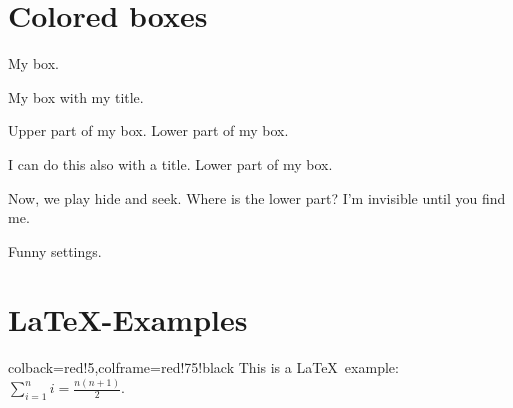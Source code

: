 \documentclass{article}
\begin{document}
\section{Colored boxes}

\begin{tcolorbox}[colback=red!5,colframe=red!75!black]
  My box.
\end{tcolorbox}

\begin{tcolorbox}[colback=blue!5,colframe=blue!75!black,title=My title]
  My box with my title.
\end{tcolorbox}

\begin{tcolorbox}[colback=green!5,colframe=green!75!black]
  Upper part of my box.
  \tcblower
  Lower part of my box.
\end{tcolorbox}

\begin{tcolorbox}[colback=yellow!5,colframe=yellow!75!black,title=My title]
  I can do this also with a title.
  \tcblower
  Lower part of my box.
\end{tcolorbox}

\begin{tcolorbox}[colback=yellow!10,colframe=red!75!black,lowerbox=invisible,
  savelowerto=\jobname_ex.tex]
  Now, we play hide and seek. Where is the lower part?
  \tcblower
  I'm invisible until you find me.
\end{tcolorbox}

\begin{tcolorbox}[colback=yellow!10,colframe=red!75!black,title=Here I am]
  
\end{tcolorbox}


\begin{tcolorbox}[colback=blue!50,colframe=blue!25!black,coltext=yellow,
    fontupper=\Large\bfseries,arc=6mm,boxrule=2mm,boxsep=5mm]
  Funny settings.
\end{tcolorbox}


\clearpage
\section{\LaTeX-Examples}

\begin{tcblisting}{colback=red!5,colframe=red!75!black}
This is a \LaTeX\ example:
$\displaystyle\sum\limits_{i=1}^n i = \frac{n(n+1)}{2}$.
\end{tcblisting}
\end{document}
